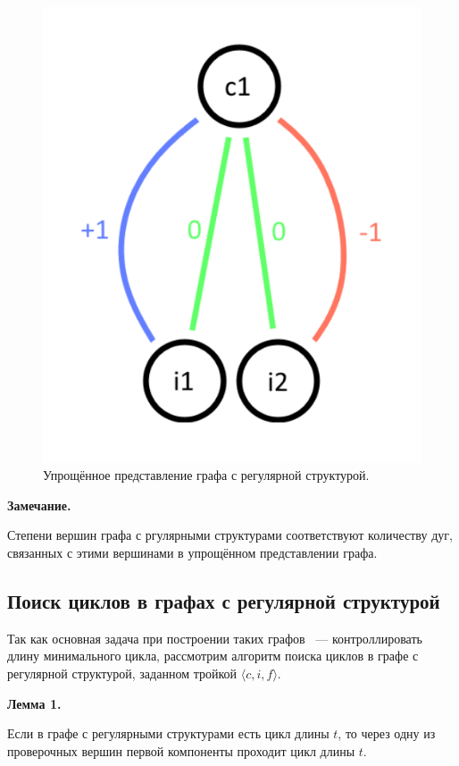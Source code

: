 \documentclass[14pt]{mmcs_article}
\begin{document}
\begin{figure}[H]
  \centering
  \includegraphics[scale=0.4]{Fig_2.png}
  \caption{ Упрощённое представление графа с регулярной структурой. }
  \label{image:2}
\end{figure}

\textbf{Замечание.}

Степени вершин графа с ргулярными структурами соответствуют количеству дуг, связанных с этими вершинами в упрощённом представлении графа.

\subsection{Поиск циклов в графах с регулярной структурой}

Так как основная задача при построении таких графов ~--- контроллировать длину минимального цикла, рассмотрим алгоритм поиска циклов в графе с регулярной структурой, заданном тройкой $\langle c, i, f \rangle$.

\textbf{Лемма 1.}

Если в графе с регулярными структурами есть цикл длины $t$, то через одну из проверочных вершин первой компоненты проходит цикл длины $t$.
\end{document}
